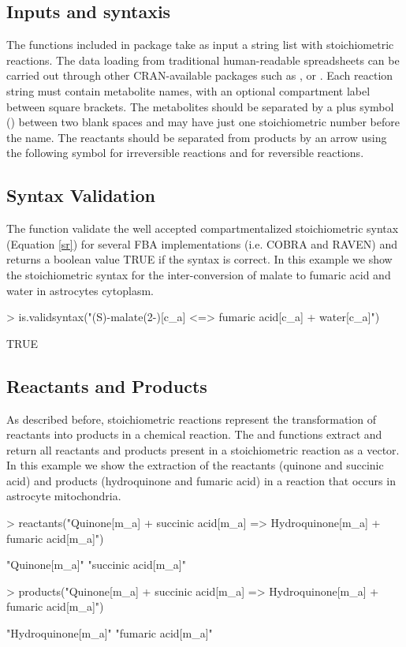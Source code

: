 \subsection{Inputs and syntaxis}
The functions included in  package take as input a string list with stoichiometric reactions. The data loading from traditional human-readable spreadsheets can be carried out through other CRAN-available packages such as ,  or . Each reaction string must contain metabolite names, with an optional compartment label between square brackets. The metabolites should be separated by a plus symbol (\code{+}) between two blank spaces and may have just one stoichiometric number before the name. The reactants should be separated from products by an arrow using the following symbol \code{=>} for irreversible reactions and \code{<=>} for reversible reactions.
\subsection{Syntax Validation}
The  function validate the well accepted compartmentalized stoichiometric syntax (Equation \ref{sr}) for several FBA implementations (i.e. COBRA and RAVEN) and returns a boolean value TRUE if the syntax is correct. In this example we show the stoichiometric syntax for the inter-conversion of  malate to fumaric acid and water in astrocytes cytoplasm.
\begin{Schunk}
\begin{Sinput}
> is.validsyntax("(S)-malate(2-)[c_a] <=> fumaric acid[c_a] + water[c_a]")
\end{Sinput}
\begin{Soutput}
[1] TRUE
\end{Soutput}
\end{Schunk}
\subsection{Reactants and Products}
As described before, stoichiometric reactions represent the transformation of reactants into products in a chemical reaction. The  and  functions extract and return all reactants and products present in a stoichiometric reaction  as a vector. In this example we show the extraction of the reactants (quinone and succinic acid) and products (hydroquinone and fumaric acid) in a reaction that occurs in astrocyte mitochondria.
\begin{Schunk}
\begin{Sinput}
> reactants("Quinone[m_a] + succinic acid[m_a] => Hydroquinone[m_a] + fumaric acid[m_a]")
\end{Sinput}
\begin{Soutput}
[1] "Quinone[m_a]"       "succinic acid[m_a]"
\end{Soutput}
\begin{Sinput}
> products("Quinone[m_a] + succinic acid[m_a] => Hydroquinone[m_a] + fumaric acid[m_a]")
\end{Sinput}
\begin{Soutput}
[1] "Hydroquinone[m_a]" "fumaric acid[m_a]"
\end{Soutput}
\end{Schunk}
